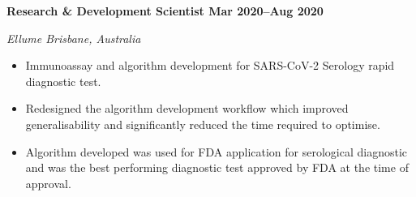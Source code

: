 \textbf{Research \& Development Scientist \hfill Mar 2020--Aug 2020}\par
\textit{Ellume \hfill Brisbane, Australia}\par
\begin{itemize}
	\item Immunoassay and algorithm development for SARS-CoV-2 Serology rapid diagnostic test.
	\item Redesigned the algorithm development workflow which improved generalisability and significantly reduced the time required to optimise.
    \item Algorithm developed was used for FDA application for serological diagnostic and was the best performing diagnostic test approved by FDA at the time of approval.
\end{itemize}\par